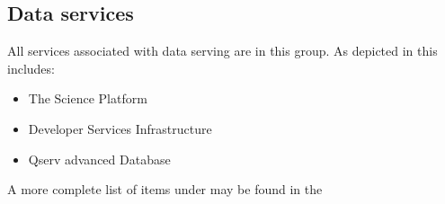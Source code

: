 \subsection{ Data services} \label{sec:servingdata}

All services associated with data serving are in this group.
As depicted in  this includes:

\begin{itemize}
\item The Science Platform
\item Developer Services Infrastructure
\item Qserv advanced Database
\end{itemize}

A more complete list of items under may be found in the 
